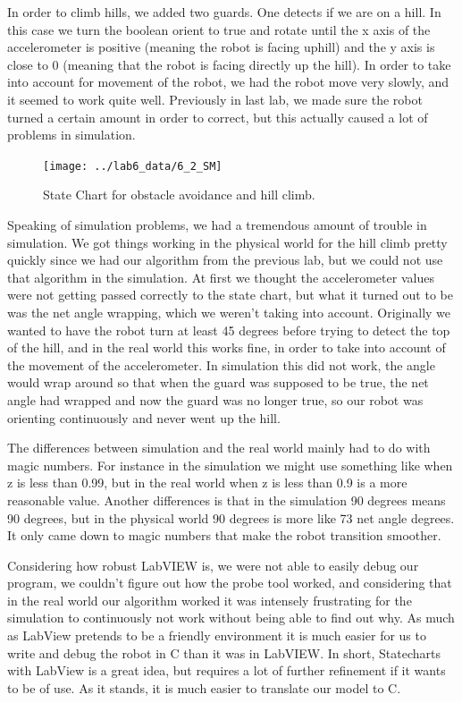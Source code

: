 \documentclass[10pt,titlepage]{article}
\begin{document}
    In order to climb hills, we added two guards. One detects if we are on a hill. In this case we turn the boolean orient to true and rotate until the x axis of the accelerometer is positive (meaning the robot is facing uphill) and the y axis is close to 0 (meaning that the robot is facing directly up the hill). In order to take into account for movement of the robot, we had the robot move very slowly, and it seemed to work quite well. Previously in last lab, we made sure the robot turned a certain amount in order to correct, but this actually caused a lot of problems in simulation.

    \begin{figure}[h]
      \texttt{[image: ../lab6\_data/6\_2\_SM]}
      \caption{State Chart for obstacle avoidance and hill climb.}
    \end{figure}

    Speaking of simulation problems, we had a tremendous amount of trouble in simulation. We got things working in the physical world for the hill climb pretty quickly since we had our algorithm from the previous lab, but we could not use that algorithm in the simulation. At first we thought the accelerometer values were not getting passed correctly to the state chart, but what it turned out to be was the net angle wrapping, which we weren't taking into account. Originally we wanted to have the robot turn at least 45 degrees before trying to detect the top of the hill, and in the real world this works fine, in order to take into account of the movement of the accelerometer. In simulation this did not work, the angle would wrap around so that when the guard was supposed to be true, the net angle had wrapped and now the guard was no longer true, so our robot was orienting continuously and never went up the hill.

    The differences between simulation and the real world mainly had to do with magic numbers. For instance in the simulation we might use something like when z is less than 0.99, but in the real world when z is less than 0.9 is a more reasonable value. Another differences is that in the simulation 90 degrees means 90 degrees, but in the physical world 90 degrees is more like 73 net angle degrees. It only came down to magic numbers that make the robot transition smoother.

    Considering how robust LabVIEW is, we were not able to easily debug our program, we couldn't figure out how the probe tool worked, and considering that in the real world our algorithm worked it was intensely frustrating for the simulation to continuously not work without being able to find out why. As much as LabView pretends to be a friendly environment it is much easier for us to write and debug the robot in C than it was in LabVIEW. In short, Statecharts with LabView is a great idea, but requires a lot of further refinement if it wants to be of use. As it stands, it is much easier to translate our model to C.
\end{document}
